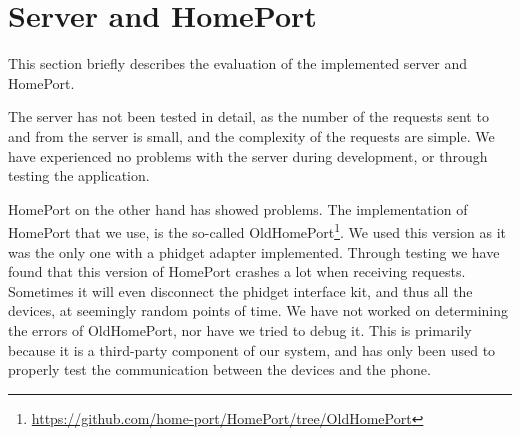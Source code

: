 \section{Server and HomePort}\label{sec:servereval}
This section briefly describes the evaluation of the implemented server and HomePort. 

The server has not been tested in detail, 
as the number of the requests sent to and from the server is small,
and the complexity of the requests are simple. 
We have experienced no problems with the server during development,
or through testing the application. 

HomePort on the other hand has showed problems. 
The implementation of HomePort that we use, 
is the so-called OldHomePort\footnote{\url{https://github.com/home-port/HomePort/tree/OldHomePort}}. 
We used this version as it was the only one with a phidget adapter implemented. 
Through testing we have found that this version of HomePort crashes a lot when receiving requests. 
Sometimes it will even disconnect the phidget interface kit, 
and thus all the devices, at seemingly random points of time. 
We have not worked on determining the errors of OldHomePort, 
nor have we tried to debug it. 
This is primarily because it is a third-party component of our system, 
and has only been used to properly test the communication between the devices and the phone. 